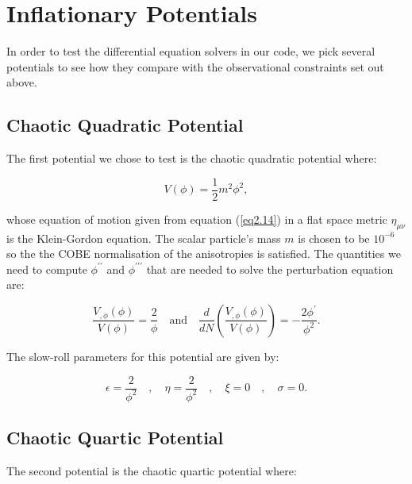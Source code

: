 \documentclass[a4paper,12pt,twoside]{report}
\begin{document}
\section{Inflationary Potentials} \label{sec:InflatPots}

In order to test the differential equation solvers in our code, we pick several potentials to see how they compare with the observational constraints set out above.

\subsection{Chaotic Quadratic Potential} \label{subsec:ChaoSquPot}

The first potential we chose to test is the chaotic quadratic potential where:

\begin{equation} \label{eq3.37}
V(\phi) = \frac{1}{2} m^{2} \phi^{2},
\end{equation}

whose equation of motion given from equation (\ref{eq2.14}) in a flat space metric $\eta_{\mu\nu}$ is the Klein-Gordon equation. The scalar particle's mass $m$ is chosen to be $10^{-6}$ so the the COBE normalisation \cite{White:1995ic} of the anisotropies is satisfied. The quantities we need to compute $\phi^{\prime \prime}$ and $\phi^{\prime \prime \prime}$ that are needed to solve the perturbation equation are:

\begin{equation} \label{eq3.38}
\frac{V_{,\phi}(\phi)}{V(\phi)} = \frac{2}{\phi} \quad \mathrm{and} \quad \frac{d}{dN} \left( \frac{V_{,\phi}(\phi)}{V(\phi)} \right) = - \frac{2\phi^{\prime}}{\phi^{2}}.
\end{equation}

The slow-roll parameters for this potential are given by:

\begin{equation} \label{eq3.39}
\epsilon = \frac{2}{\phi^{2}} \quad , \quad \eta = \frac{2}{\phi^{2}} \quad , \quad \xi = 0 \quad , \quad \sigma =  0.
\end{equation}

\subsection{Chaotic Quartic Potential} \label{subsec:ChaoQuaPot}

The second potential is the chaotic quartic potential where:
\end{document}
